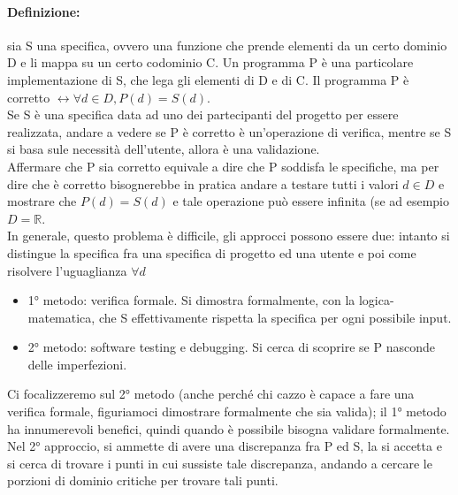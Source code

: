 \documentclass{article}
\begin{document}
\paragraph{Definizione:} sia S una specifica, ovvero una funzione che prende elementi da un certo dominio D e li mappa su un certo codominio C. Un programma P è una particolare implementazione di S, che lega gli elementi di D e di C. Il programma P è corretto $\leftrightarrow \forall d \in D, P(d) = S(d)$.\\ Se S è una specifica data ad uno dei partecipanti del progetto per essere realizzata, andare a vedere se P è corretto è un'operazione di verifica, mentre se S si basa sule necessità dell'utente, allora è una validazione.\\ Affermare che P sia corretto equivale a dire che P soddisfa le specifiche, ma per dire che è corretto bisognerebbe in pratica andare a testare tutti i valori $d \in D$ e mostrare che $P(d) = S(d)$ e tale operazione può essere infinita (se ad esempio $D = \mathbb{R}$.\\ In generale, questo problema è difficile, gli approcci possono essere due: intanto si distingue la specifica fra una specifica di progetto ed una utente e poi come risolvere l'uguaglianza $\forall d$
\begin{itemize}
\item 1° metodo: verifica formale. Si dimostra formalmente, con la logica-matematica, che S effettivamente rispetta la specifica per ogni possibile input.
\item 2° metodo: software testing e debugging. Si cerca di scoprire se P nasconde delle imperfezioni.
\end{itemize}
Ci focalizzeremo sul 2° metodo (anche perché chi cazzo è capace a fare una verifica formale, figuriamoci dimostrare formalmente che sia valida); il 1° metodo ha innumerevoli benefici, quindi quando è possibile bisogna validare formalmente.\\ Nel 2° approccio, si ammette di avere una discrepanza fra P ed S, la si accetta e si cerca di trovare i punti in cui sussiste tale discrepanza, andando a cercare le porzioni di dominio critiche per trovare tali punti.
\end{document}
